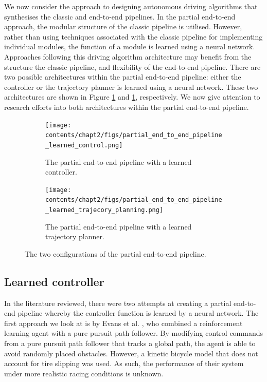 We now consider the approach to designing autonomous driving algorithms that synthesises the classic and end-to-end pipelines. 
In the partial end-to-end approach, the modular structure of the classic pipeline is utilised.
However, rather than using techniques associated with the classic pipeline for implementing individual modules, the function of a module is learned using a neural network.
Approaches following this driving algorithm architecture may benefit from the structure the classic pipeline, and flexibility of the end-to-end pipeline.
There are two possible architectures within the partial end-to-end pipeline: either the controller or the trajectory planner is learned using a neural network. 
These two architectures are shown in Figure \ref{fig:pete_learned_control} and \ref{fig:pete_learned_control}, respectively.
We now give attention to research efforts into both architectures within the partial end-to-end pipeline.

\begin{figure}[h]
    \centering
    \begin{subfigure}[htb!]{\textwidth}
        \centering
        \texttt{[image: contents/chapt2/figs/partial\_end\_to\_end\_pipeline\_learned\_control.png]}
         \caption[The partial end-to-end pipeline with a learned controller]{The partial end-to-end pipeline with a learned controller.}
        \label{fig:pete_learned_control}
    \end{subfigure}
    \hfill
    \begin{subfigure}[htb!]{\textwidth}
        \centering
        \texttt{[image: contents/chapt2/figs/partial\_end\_to\_end\_pipeline\_learned\_trajecory\_planning.png]}
        \caption[The partial end-to-end pipeline with a learned trajectory planner]{The partial end-to-end pipeline with a learned trajectory planner.}
        \label{fig:pete_learned_trajectory_planning}
    \end{subfigure}
\caption[Configurations of the partial end-to-end pipeline]{The two configurations of the partial end-to-end pipeline.}
\label{fig:pete}
\end{figure}

\subsection{Learned controller}
\label{sec:learned_controller}

In the literature reviewed, there were two attempts at creating a partial end-to-end pipeline whereby the controller function is learned by a neural network.
The first approach we look at is by Evans et al. \cite{Evans2021b}, who combined a reinforcement learning agent with a pure pursuit path follower.
By modifying control commands from a pure pursuit path follower that tracks a global path, the agent is able to avoid randomly placed obstacles.
However, a kinetic bicycle model that does not account for tire slipping was used.
As such, the performance of their system under more realistic racing conditions is unknown.

